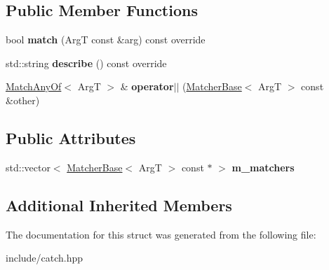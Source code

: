 \subsection*{Public Member Functions}
\begin{DoxyCompactItemize}
\item 
bool {\bfseries match} (ArgT const \&arg) const override\hypertarget{structCatch_1_1Matchers_1_1Impl_1_1MatchAnyOf_a8a3e8338f979e56277dcf553efb78dc0}{}\label{structCatch_1_1Matchers_1_1Impl_1_1MatchAnyOf_a8a3e8338f979e56277dcf553efb78dc0}

\item 
std\+::string {\bfseries describe} () const override\hypertarget{structCatch_1_1Matchers_1_1Impl_1_1MatchAnyOf_a315285204df93d1f8e72f50dd66eb709}{}\label{structCatch_1_1Matchers_1_1Impl_1_1MatchAnyOf_a315285204df93d1f8e72f50dd66eb709}

\item 
\hyperlink{structCatch_1_1Matchers_1_1Impl_1_1MatchAnyOf}{Match\+Any\+Of}$<$ ArgT $>$ \& {\bfseries operator$\vert$$\vert$} (\hyperlink{structCatch_1_1Matchers_1_1Impl_1_1MatcherBase}{Matcher\+Base}$<$ ArgT $>$ const \&other)\hypertarget{structCatch_1_1Matchers_1_1Impl_1_1MatchAnyOf_a44d7582dbe09fc31b9a5ba8a6367b506}{}\label{structCatch_1_1Matchers_1_1Impl_1_1MatchAnyOf_a44d7582dbe09fc31b9a5ba8a6367b506}

\end{DoxyCompactItemize}
\subsection*{Public Attributes}
\begin{DoxyCompactItemize}
\item 
std\+::vector$<$ \hyperlink{structCatch_1_1Matchers_1_1Impl_1_1MatcherBase}{Matcher\+Base}$<$ ArgT $>$ const $\ast$ $>$ {\bfseries m\+\_\+matchers}\hypertarget{structCatch_1_1Matchers_1_1Impl_1_1MatchAnyOf_a1fb1119e6110dc15b8d5262ec0aeddd5}{}\label{structCatch_1_1Matchers_1_1Impl_1_1MatchAnyOf_a1fb1119e6110dc15b8d5262ec0aeddd5}

\end{DoxyCompactItemize}
\subsection*{Additional Inherited Members}


The documentation for this struct was generated from the following file\+:\begin{DoxyCompactItemize}
\item 
include/catch.\+hpp\end{DoxyCompactItemize}
